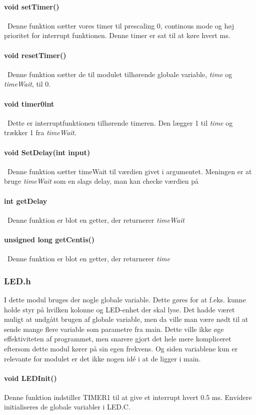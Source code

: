 \paragraph{void setTimer()}\
Denne funktion sætter vores timer til prescaling 0, continous mode og høj prioritet for interrupt funktionen. Denne timer er sat til at køre hvert ms.
\paragraph{void resetTimer()}\
Denne funktion sætter de til modulet tilhørende globale variable, \textit{time} og \textit{timeWait}, til 0.
\paragraph{void timer0int}\
Dette er interruptfunktionen tilhørende timeren. Den lægger 1 til \textit{time} og trækker 1 fra \textit{timeWait}. 
\paragraph{void SetDelay(int input)}\
Denne funktion sætter timeWait til værdien givet i argumentet. Meningen er at bruge \textit{timeWait} som en slags delay, man kan checke værdien på
\paragraph{int getDelay}\
Denne funktion er blot en getter, der returnerer \textit{timeWait}
\paragraph{unsigned long getCentis()}\
Denne funktion er blot en getter, der returnerer \textit{time}
\subsubsection{LED.h}
I dette modul bruges der nogle globale variable. Dette gøres for at f.eks. kunne holde styr på hvilken kolonne og LED-enhet der skal lyse. Det hadde været muligt at undgått brugen af globale variable, men da ville man være nødt til at sende mange flere variable som parametre fra main. Dette ville ikke øge effektiviteten af programmet, men snarere gjort det hele mere kompliceret eftersom dette modul kører på sin egen frekvens. Og siden variablene kun er relevante for modulet er det ikke nogen idé i at de ligger i main.

\paragraph{void LEDInit()}
Denne funktion indstiller TIMER1 til at give et interrupt hvert 0.5 ms. Envidere initialiseres de globale variabler i LED.C.

